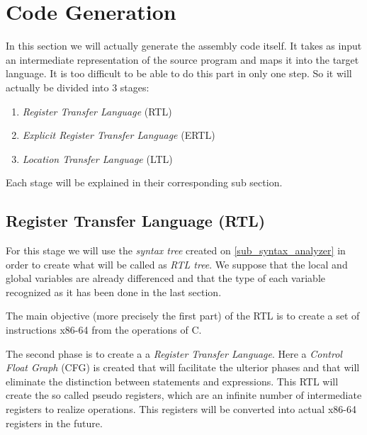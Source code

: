 \documentclass[conference]{IEEEtran}
\begin{document}
\section{Code Generation}
In this section we will actually generate the assembly code itself. It takes as input an intermediate representation of the source program and maps it into the target language. 
It is too difficult to be able to do this part in only one step. So it will actually be divided into 3 stages:
\begin{enumerate}
	\item \textit{Register Transfer Language} (RTL)
	\item \textit{Explicit Register Transfer Language} (ERTL)
	\item \textit{Location Transfer Language} (LTL)
\end{enumerate}
Each stage will be explained in their corresponding sub section.

\subsection{Register Transfer Language (RTL)}
For this stage we will use the \textit{syntax tree} created on \ref{sub_syntax_analyzer} in order to create what will be called as \textit{RTL tree}. We suppose that the local and global variables are already differenced and that the type of each variable recognized as it has been done in the last section.

The main objective (more precisely the first part) of the RTL is to create a set of instructions x86-64 from the operations of C.

The second phase is to create a a \textit{Register Transfer Language}. Here a \textit{Control Float Graph} (CFG) is created that will facilitate the ulterior phases and that will eliminate the distinction between statements and expressions. This RTL will create the so called pseudo registers, which are an infinite number of intermediate registers to realize operations. This registers will be converted into actual x86-64 registers in the future.
\end{document}
